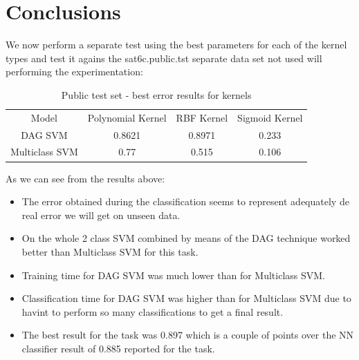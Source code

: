\documentclass[a4paper,10pt,titlepage]{article}
\begin{document}
\section{Conclusions}

\par We now perform a separate test using the best parameters for each of the kernel types and test it agains the  
sat6c.public.tst separate data set not used will performing the experimentation: 

\begin{table}[H] 
\caption{Public test set - best error results for kernels} %
\centering 
\begin{tabular}{c c c c} 
\hline\hline 
Model & Polynomial Kernel & RBF Kernel & Sigmoid Kernel \\
DAG SVM & 0.8621 & 0.8971 & 0.233\\
Multiclass SVM & 0.77 & 0.515 & 0.106\\ 

\hline 
\end{tabular} 
\label{tab:dist_result} 
\end{table}

\par As we can see from the results above:
\begin{itemize}
	\item The error obtained during the classification seems to represent adequately de real error we will get on unseen data.
	\item On the whole 2 class SVM combined by means of the DAG technique worked better than Multiclass SVM for this task.
	\item Training time for DAG SVM was much lower than for Multiclass SVM.
	\item Classification time for DAG SVM was higher than for Multiclass SVM due to havint to perform so many classifications to get a final result.
	\item The best result for the task was 0.897 which is a couple of points over the NN classifier result of 0.885 reported for the task. 
\end{itemize}
\end{document}
